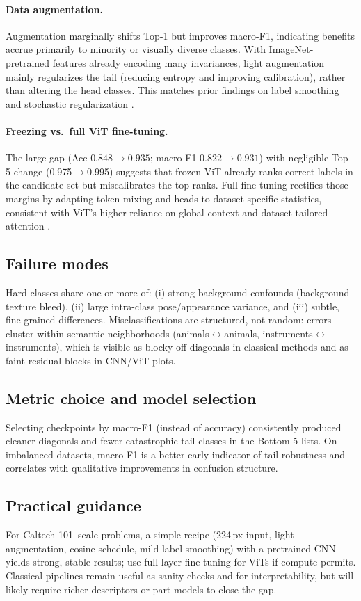 \documentclass[11pt]{article}
\begin{document}
\paragraph{Data augmentation.} Augmentation marginally shifts Top-1 but improves macro-F1, indicating benefits accrue primarily to minority or visually diverse classes. With ImageNet-pretrained features already encoding many invariances, light augmentation mainly regularizes the tail (reducing entropy and improving calibration), rather than altering the head classes. This matches prior findings on label smoothing and stochastic regularization \cite{Szegedy2016}.

\paragraph{Freezing vs.\ full ViT fine-tuning.} The large gap (Acc $0.848\to0.935$; macro-F1 $0.822\to0.931$) with negligible Top-5 change (0.975$\to$0.995) suggests that frozen ViT already ranks correct labels in the candidate set but miscalibrates the top ranks. Full fine-tuning rectifies those margins by adapting token mixing and heads to dataset-specific statistics, consistent with ViT’s higher reliance on global context and dataset-tailored attention \cite{Dosovitskiy2021}.

\subsection{Failure modes}
Hard classes share one or more of: (i) strong background confounds (background-texture bleed), (ii) large intra-class pose/appearance variance, and (iii) subtle, fine-grained differences. Misclassifications are structured, not random: errors cluster within semantic neighborhoods (animals$\leftrightarrow$animals, instruments$\leftrightarrow$instruments), which is visible as blocky off-diagonals in classical methods and as faint residual blocks in CNN/ViT plots.

\subsection{Metric choice and model selection}
Selecting checkpoints by macro-F1 (instead of accuracy) consistently produced cleaner diagonals and fewer catastrophic tail classes in the Bottom-5 lists. On imbalanced datasets, macro-F1 is a better early indicator of tail robustness and correlates with qualitative improvements in confusion structure.

\subsection{Practical guidance}
For Caltech-101–scale problems, a simple recipe (224\,px input, light augmentation, cosine schedule, mild label smoothing) with a pretrained CNN yields strong, stable results; use full-layer fine-tuning for ViTs if compute permits. Classical pipelines remain useful as sanity checks and for interpretability, but will likely require richer descriptors or part models to close the gap.
\end{document}
